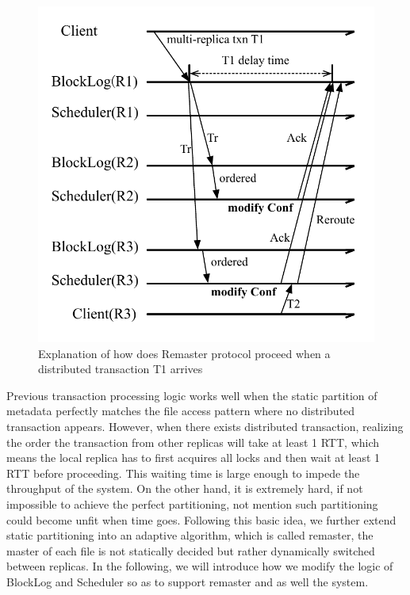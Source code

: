 \begin{figure}[tp]
\centering
\includegraphics[width=\columnwidth]{figures/flow}
\caption{Explanation of how does Remaster protocol proceed when a distributed transaction T1 arrives}
\label{fig:flow}
\end{figure}

Previous transaction processing logic works well when the static partition of metadata perfectly matches the file access pattern where no distributed transaction appears. However, when there exists distributed transaction, realizing the order the transaction from other replicas will take at least 1 RTT, which means the local replica has to first acquires all locks and then wait at least 1 RTT before proceeding. This waiting time is large enough to impede the throughput of the system. On the other hand, it is extremely hard, if not impossible to achieve the perfect partitioning, not mention such partitioning could become unfit when time goes. Following this basic idea, we further extend static partitioning into an adaptive algorithm, which is called remaster, the master of each file is not statically decided but rather dynamically switched between replicas. In the following, we will introduce how we modify the logic of BlockLog and Scheduler so as to support remaster and as well the \name{} system.

